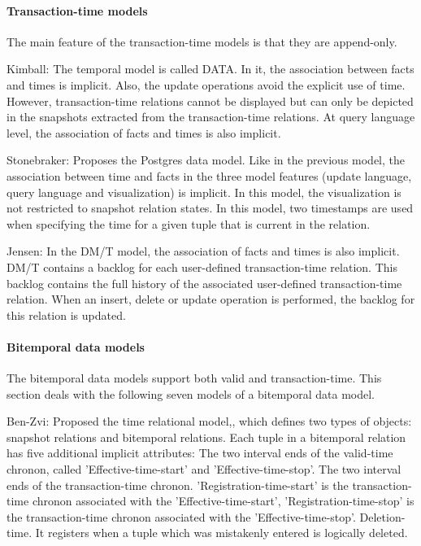 \paragraph{Transaction-time models}
The main feature of the transaction-time models is that they are append-only.

Kimball: \cite{kim78} The temporal model is called DATA. In it, the association between facts and times is implicit. Also, the update operations avoid the explicit use of time. However, transaction-time relations cannot be displayed but can only be depicted in the snapshots extracted from the transaction-time relations. At query language level, the association of facts and times is also implicit.

Stonebraker: \cite{Ston87} Proposes the Postgres data model. Like in the previous model, the association between time and facts in the three model features (update language, query language and visualization) is implicit. In this model, the visualization is not restricted to snapshot relation states.
In this model, two timestamps are used when specifying the time for a given tuple that is current in the relation.

Jensen: \cite{Jensen:1991:IIM:627283.627484} In the DM/T model, the association of facts and times is also implicit. DM/T contains a backlog for each user-defined transaction-time relation. This backlog contains the full history of the associated user-defined transaction-time relation. When an insert, delete or update operation is performed, the backlog for this relation is updated.

\paragraph{Bitemporal data models}
The bitemporal data models support both valid and transaction-time. This section deals with the following seven models of a bitemporal data model.

Ben-Zvi: \cite{910377} Proposed the time relational model,, which defines two types of objects: snapshot relations and bitemporal relations. Each tuple in a bitemporal relation has five additional implicit attributes:
The two interval ends of the valid-time chronon, called 'Effective-time-start' and 'Effective-time-stop'.
The two interval ends of the transaction-time chronon. 'Registration-time-start' is the transaction-time chronon associated with the 'Effective-time-start', 'Registration-time-stop' is the transaction-time chronon associated with the 'Effective-time-stop'.
Deletion-time. It registers when a tuple which was mistakenly entered is logically deleted.

